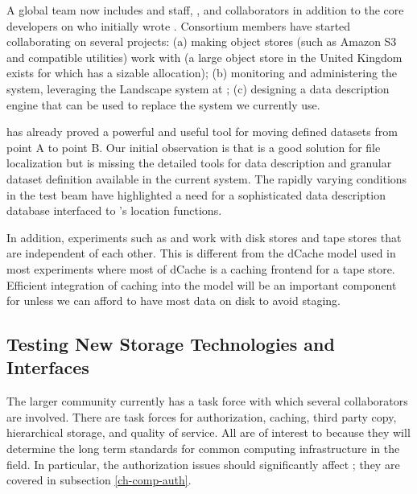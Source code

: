 A global  team now includes  and  staff, , and  collaborators  in addition to the core developers on  who initially wrote .  Consortium members have started collaborating on several projects:  (a) making object stores (such as Amazon S3 and compatible utilities) work with  (a large object store in the United Kingdom exists for which  has a sizable allocation);  (b) monitoring  and administering the  system, leveraging the Landscape system at ;  (c) designing a  data description engine that can be used to replace the  system we currently use.



 has already proved a powerful and useful tool for moving defined datasets from point A to point B.  Our initial observation is that  is a good solution for file localization but is missing the detailed tools for data description and granular dataset definition available in the current  system.  The rapidly varying conditions in the test beam have highlighted a need for a sophisticated data description database interfaced to 's location functions. 

In addition,    experiments such as  and  work with disk stores and tape stores that are independent of each other.  This is different from the dCache model used in most  experiments where most of dCache is a caching frontend for a tape store.  Efficient integration of caching into the  model will be an important component for  unless  we can afford to have most data on disk to avoid staging.

\subsection{Testing New Storage Technologies and Interfaces}

The larger  community\cite{Berzano:2018xaa} currently has a  task force
 with which several  collaborators are involved. There are task forces for authorization, caching, third party copy, hierarchical storage, and quality of service. All are of interest to  because they will determine the long term standards for common computing infrastructure in the field. 
In particular, the authorization issues should significantly affect ; they are covered in subsection \ref{ch-comp-auth}.


